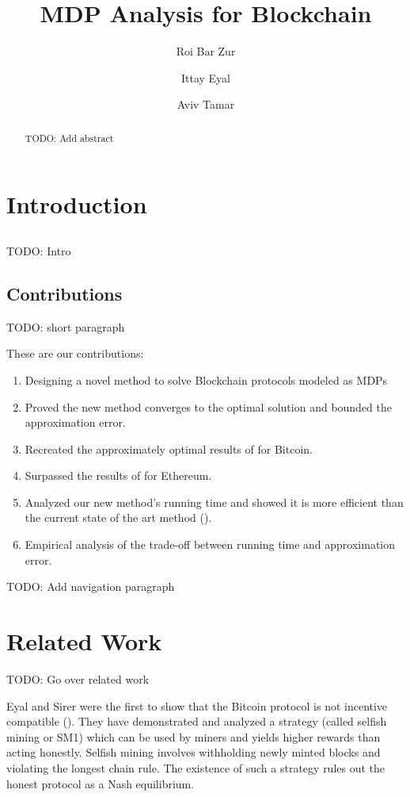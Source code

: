 \documentclass{article}
\title{MDP Analysis for Blockchain}
\author{Roi Bar Zur \and Ittay Eyal \and Aviv Tamar}
\date{}
\begin{document}
\maketitle

\begin{abstract}
    TODO: Add abstract
\end{abstract}

\section{Introduction}

\subsection{}
TODO: Intro

\subsection{Contributions}
TODO: short paragraph

These are our contributions:
\begin{enumerate}
    \item Designing a novel method to solve Blockchain protocols modeled as MDPs
    \item Proved the new method converges to the optimal solution and bounded the approximation error.
    \item Recreated the approximately optimal results of \cite{sapirshtein2016optimal} for Bitcoin.
    \item Surpassed the results of \cite{hou2019squirrl} for Ethereum.
    \item Analyzed our new method's running time and showed it is more efficient than the current state of the art method (\cite{sapirshtein2016optimal}).
    \item Empirical analysis of the trade-off between running time and approximation error.
\end{enumerate}

TODO: Add navigation paragraph

\section{Related Work}
TODO: Go over related work

Eyal and Sirer were the first to show that the Bitcoin protocol is not incentive compatible (\cite{eyalmajority}). They have demonstrated and analyzed a strategy (called selfish mining or SM1) which can be used by miners and yields higher rewards than acting honestly. Selfish mining involves withholding newly minted blocks and violating the longest chain rule. The existence of such a strategy rules out the honest protocol as a Nash equilibrium.
\end{document}
